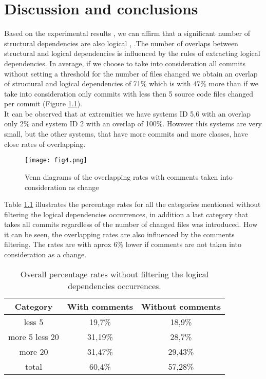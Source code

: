 \chapter{Discussion and conclusions}

\tab Based on the experimental results , we can affirm that a significant number of structural dependencies are also logical \cite{ct10}, \cite{ct9}.The number of overlaps between structural and logical dependencies is influenced by the rules of extracting logical dependencies. In average, if we choose to take into consideration all commits without setting a threshold for the number of files changed we obtain an overlap of structural and logical dependencies of 71\% which is with 47\% more than if we take into consideration only commits with less then 5 source code files changed per commit (Figure \ref{fig:figvenn}). \\ It can be observed that at extremities we have systems ID 5,6 with an overlap only 2\% and system ID 2 with an overlap of 100\%. However this systems are very small, but the other systems, that have more commits and more classes, have close rates of overlapping.
\begin{figure}[h]
\centering
\texttt{[image: fig4.png]}
\caption{Venn diagrams of the overlapping rates with comments taken into consideration as change}
\label{fig:figvenn}
\end{figure}


Table \ref{table:13} illustrates the percentage rates for all the categories mentioned without filtering the logical dependencies occurrences, in addition a last category that takes all commits regardless of the number of changed files was introduced. How it can be seen, the overlapping rates are also influenced by the comments filtering. The rates are with aprox 6\% lower if comments are not taken into consideration as a change. 


\begin{table}
  \centering
  \begin{tabular}{@{}c||cc@{}}
    \toprule
       Category & With comments & Without comments  \\
    \midrule
less 5	&	19,7\% &	18,9\%	\\
more 5 less 20	&	31,19\% &	28,7\%\\
more 20	&	31,47\%	&	29,43\%\\
total & 60,4\% &57,28\% \\
    \bottomrule
  \end{tabular}
  \caption{ Overall percentage rates without filtering the logical dependencies occurrences.}
   \label{table:13}
\end{table}

